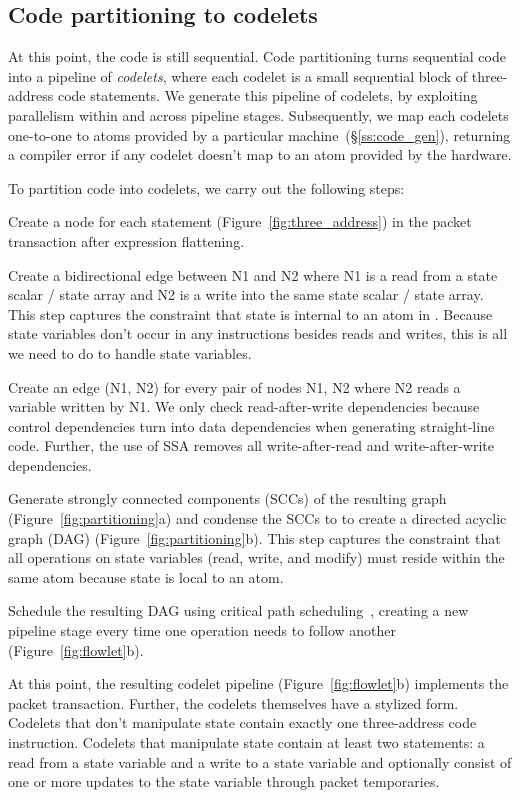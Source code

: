 \subsection{Code partitioning to codelets}
\label{ss:partitioning}
At this point, the code is still sequential. Code partitioning turns sequential
code into a pipeline of \textit{codelets}, where each codelet is a small
sequential block of three-address code statements. We generate this pipeline of
codelets, by exploiting parallelism within and across pipeline stages.
Subsequently, we map each codelets one-to-one to atoms provided by a particular
\absmachine machine~(\S\ref{ss:code_gen}), returning a compiler error if any
codelet doesn't map to an atom provided by the hardware.

To partition code into codelets, we carry out the following steps:
\begin{CompactEnumerate}
  \item Create a node for each statement (Figure~\ref{fig:three_address}) in
    the packet transaction after expression flattening.
  \item Create a bidirectional edge between N1 and N2 where N1 is a read from a
    state scalar / state array and N2 is a write into the same state scalar /
    state array. This step captures the constraint that state is internal to an
    atom in \absmachine. Because state variables don't occur in any
    instructions besides reads and writes, this is all we need to do to handle
    state variables.
  \item Create an edge (N1, N2) for every pair of nodes N1, N2 where N2 reads
    a variable written by N1. We only check read-after-write dependencies because
    control dependencies turn into data dependencies when generating straight-line
    code. Further, the use of SSA removes all write-after-read and write-after-write
    dependencies.
  \item Generate strongly connected components (SCCs) of the resulting graph
    (Figure~\ref{fig:partitioning}a) and condense the SCCs to to create a directed
    acyclic graph (DAG) (Figure~\ref{fig:partitioning}b). This step captures the
    constraint that all operations on state variables (read, write, and modify)
    must reside within the same atom because state is local to an atom.
  \item Schedule the resulting DAG using critical path
    scheduling~\cite{crit_path_sched}, creating a new pipeline stage every time
    one operation needs to follow another (Figure~\ref{fig:flowlet}b).
\end{CompactEnumerate}
At this point, the resulting codelet pipeline (Figure~\ref{fig:flowlet}b)
implements the packet transaction.  Further, the codelets themselves have a
stylized form.  Codelets that don't manipulate state contain exactly one
three-address code instruction. Codelets that manipulate state contain at least
two statements: a read from a state variable and a write to a state variable
and optionally consist of one or more updates to the state variable through
packet temporaries.


